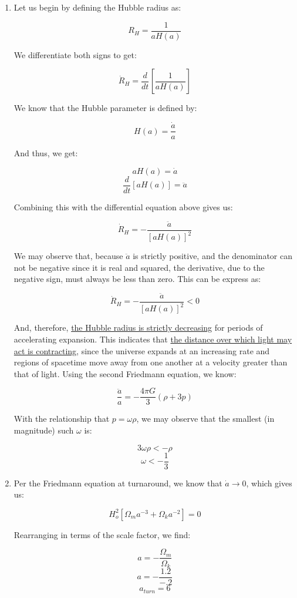 \begin{enumerate}
  \item Let us begin by defining the Hubble radius as:

    $$R_H=\frac{1}{aH(a)}$$

    We differentiate both signs to get:

    $$\dot{R}_H=\frac{d}{dt}\left[ \frac{1}{aH(a)} \right]$$

    We know that the Hubble parameter is defined by:

    $$H(a)=\frac{\dot{a}}{a}$$

    And thus, we get:

    $$aH(a)=\dot{a}$$
    $$\frac{d}{dt}[aH(a)]=\ddot{a}$$

    Combining this with the differential equation above gives us:

    $$\dot{R}_H=-\frac{\ddot{a}}{[aH(a)]^2}$$

    We may observe that, because $\ddot{a}$ is strictly positive, and the denominator can not be negative since it is real and squared, the derivative, due to the negative sign, must always be less than zero. This can be express as:

    $$\boxed{\dot{R}_H=-\frac{\ddot{a}}{[aH(a)]^2}<0}$$

    And, therefore, \underline{the Hubble radius is strictly decreasing} for periods of accelerating expansion. This indicates that \underline{the distance over which light may act is contracting}, since the universe expands at an increasing rate and regions of spacetime move away from one another at a velocity greater than that of light. Using the second Friedmann equation, we know:

    $$\frac{\ddot{a}}{a}=-\frac{4\pi G}{3}(\rho +3p)$$

    With the relationship that $p=\omega\rho$, we may observe that the smallest (in magnitude) such $\omega$ is:

    $$3\omega\rho<-\rho$$
    $$\boxed{\omega<-\frac{1}{3}}$$

  \item

    Per the Friedmann equation at turnaround, we know that $\dot{a}\to0$, which gives us:

    $$H_o^2\left[ \Omega_ma^{-3}+\Omega_k a^{-2} \right]=0$$

    Rearranging in terms of the scale factor, we find:

    $$a=-\frac{\Omega_m}{\Omega_k}$$
    $$a=-\frac{1.2}{-.2}$$
    $$\boxed{a_{turn}=6}$$


\end{enumerate}

